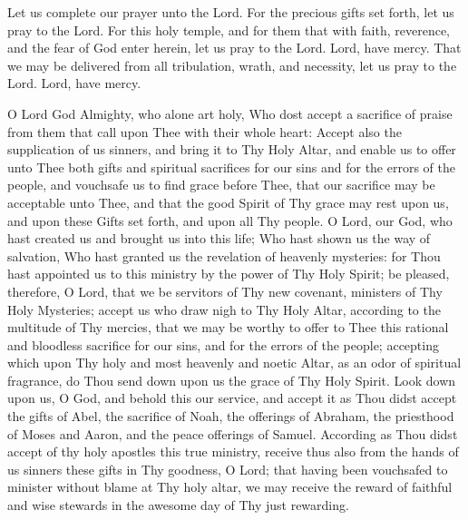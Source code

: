 \begin{liturgicaltext}
    \deacon Let us complete our prayer unto the Lord.
    \choir {}
    \deacon For the precious gifts set forth, let us pray to the Lord.
    \choir {}
    \deacon For this holy temple, and for them that with faith, reverence, and the fear of God enter herein, let us pray to the Lord.
    \choir Lord, have mercy.
    \deacon That we may be delivered from all tribulation, wrath, and necessity, let us pray to the Lord.
    \choirsemisecret Lord, have mercy. 
\end{liturgicaltext}
\begin{semisecret}
    \begin{secretprayerbasil}
        O Lord God Almighty, who alone art holy, Who dost accept a sacrifice of praise from them that call upon Thee with their whole heart: Accept also the supplication of us sinners, and bring it to Thy Holy Altar, and enable us to offer unto Thee both gifts and spiritual sacrifices for our sins and for the errors of the people, and vouchsafe us to find grace before Thee, that our sacrifice may be acceptable unto Thee, and that the good Spirit of Thy grace may rest upon us, and upon these Gifts set forth, and upon all Thy people. 
        \switchcolumn
        O Lord, our God, who hast created us and brought us into this life; Who hast shown us the way of salvation, Who hast granted us the revelation of heavenly mysteries: for Thou hast appointed us to this ministry by the power of Thy Holy Spirit; be pleased, therefore, O Lord, that we be servitors of Thy new covenant, ministers of Thy Holy Mysteries; accept us who draw nigh to Thy Holy Altar, according to the multitude of Thy mercies, that we may be worthy to offer to Thee this rational and bloodless sacrifice for our sins, and for the errors of the people; accepting which upon Thy holy and most heavenly and noetic Altar, as an odor of spiritual fragrance, do Thou send down upon us the grace of Thy Holy Spirit. Look down upon us, O God, and behold this our service, and accept it as Thou didst accept the gifts of Abel, the sacrifice of Noah, the offerings of Abraham, the priesthood of Moses and Aaron, and the peace offerings of Samuel. According as Thou didst accept of thy holy apostles this true ministry, receive thus also from the hands of us sinners these gifts in Thy goodness, O Lord; that having been vouchsafed to minister without blame at Thy holy altar, we may receive the reward of faithful and wise stewards in the awesome day of Thy just rewarding. 
    \end{secretprayerbasil}
\end{semisecret}
